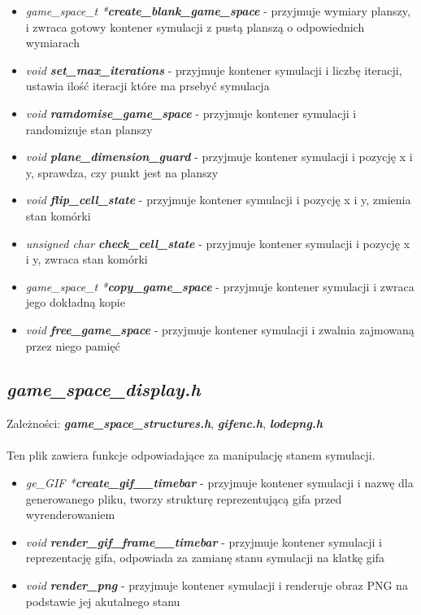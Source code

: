 \documentclass[12pt]{article}
\begin{document}
        \begin{itemize}
            \item \textit{game\_space\_t *\textbf{create\_blank\_game\_space}} - przyjmuje wymiary planszy, i zwraca gotowy kontener symulacji z pustą planszą o odpowiednich wymiarach
            \item \textit{void \textbf{set\_max\_iterations}} - przyjmuje kontener symulacji i liczbę iteracji, ustawia ilość iteracji które ma prsebyć symulacja
            \item \textit{void \textbf{ramdomise\_game\_space}} - przyjmuje kontener symulacji i randomizuje stan planszy
            \item \textit{void \textbf{plane\_dimension\_guard}} - przyjmuje kontener symulacji i pozycję x i y, sprawdza, czy punkt jest na planszy
            \item \textit{void \textbf{flip\_cell\_state}} - przyjmuje kontener symulacji i pozycję x i y, zmienia stan komórki
            \item \textit{unsigned char \textbf{check\_cell\_state}} - przyjmuje kontener symulacji i pozycję x i y, zwraca stan komórki
            \item \textit{game\_space\_t *\textbf{copy\_game\_space}} - przyjmuje kontener symulacji i zwraca jego dokładną kopie
            \item \textit{void \textbf{free\_game\_space}} - przyjmuje kontener symulacji i zwalnia zajmowaną przez niego pamięć
        \end{itemize}


    \subsection{\textbf{\textit{game\_space\_display.h}}}
        Zależności: \textit{ \textbf{game\_space\_structures.h}}, \textit{ \textbf{gifenc.h}}, \textit{ \textbf{lodepng.h}}\\\\
        Ten plik zawiera funkcje odpowiadające za manipulację stanem symulacji.

        \begin{itemize}
            \item \textit{ge\_GIF *\textbf{create\_gif\_\_timebar}} - przyjmuje kontener symulacji i nazwę dla generowanego pliku, tworzy strukturę reprezentującą gifa przed wyrenderowaniem
            \item \textit{void \textbf{render\_gif\_frame\_\_timebar}} - przyjmuje kontener symulacji i reprezentację gifa, odpowiada za zamianę stanu symulacji na klatkę gifa
            \item \textit{void \textbf{render\_png}} - przyjmuje kontener symulacji i renderuje obraz PNG na podstawie jej akutalnego stanu
        \end{itemize}
\end{document}
